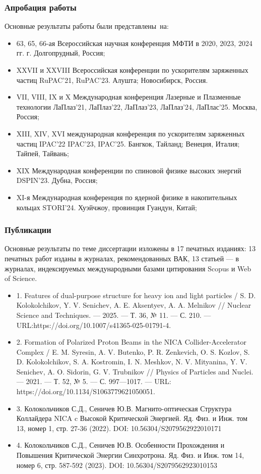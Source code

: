 \begin{frame}
	\frametitle{Апробация работы}
	Основные результаты работы были представлены~на:
	\small
	\begin{itemize}
		\item 63, 65, 66-ая Всероссийская научная конференция МФТИ в 2020, 2023, 2024 гг. г. Долгопрудный,
		Россия;
		\item XXVII и XXVIII Всероссийская конференции по ускорителям заряженных частиц RuPAC'21, RuPAC'23. Алушта; Новосибирск, Россия.
		\item VII, VIII, IX и X Международная конференция Лазерные и Плазменные технологии ЛаПлаз'21, ЛаПлаз'22, ЛаПлаз'23, ЛаПлаз'24, ЛаПлас'25. Москва, Россия;
		\item XIII, XIV, XVI международная конференция по ускорителям заряженных частиц IPAC'22 IPAC'23, IPAC'25. Бангкок, Тайланд; Венеция, Италия; Тайпей, Тайвань;
		\item XIX Международная конференции по спиновой физике высоких энергий DSPIN'23. Дубна, Россия;
		\item XI-я Международная конференция по ядерной физике в накопительных кольцах STORI’24. Хуэйчжоу, провинция Гуандун, Китай;
	\end{itemize}
\end{frame}
\begin{frame}
	\frametitle{Публикации}
	Основные результаты по теме диссертации изложены в 17 печатных
	изданиях: 13 печатных работ изданы в журналах, рекомендованных
	ВАК, 13 статьей — в журналах, индексируемых международными
	базами цитирования Scopus и Web of Science.
	\small
	\begin{itemize}
		\item	1. Features of dual-purpose structure for heavy ion and light particles / S. D. Kolokolchikov, Y. V. Senichev, A. E. Aksentyev, A. A. Melnikov // Nuclear Science and Techniques. –– 2025. –– Т. 36, № 11. –– С. 210. –– URL:https://doi.org/10.1007/s41365-025-01791-4.
		\item	2. Formation of Polarized Proton Beams in the NICA Collider-Accelerator Complex / E. M. Syresin, A. V. Butenko, P. R. Zenkevich, O. S. Kozlov, S. D. Kolokolchikov, S. A. Kostromin, I. N. Meshkov, N. V. Mityanina, Y. V. Senichev, A. O. Sidorin, G. V. Trubnikov // Physics of Particles and Nuclei. –– 2021. –– Т. 52, № 5. –– С. 997––1017. –– URL: https://doi.org/10.1134/S1063779621050051.
		\item	3. Колокольчиков С.Д., Сеничев Ю.В. Магнито-оптическая Структура Коллайдера NICA c Высокой Критической Энергией. Яд. Физ. и Инж. том 13, номер 1, стр. 27-36 (2022). DOI: 10.56304/S2079562922010171
		\item	4. Колокольчиков С.Д., Сеничев Ю.В. Особенности Прохождения и Повышения Критической Энергии Синхротрона. Яд. Физ. и Инж. том 14, номер 6, стр. 587-592 (2023).  DOI: 10.56304/S2079562923010153
	\end{itemize}
\end{frame}
